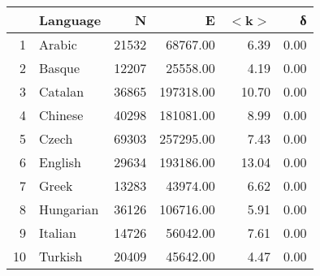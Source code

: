\begin{tabular}{rlrrrr}
  \hline
 & Language & N & E & $<$k$>$ & δ \\ 
  \hline
1 & Arabic & 21532 & 68767.00 & 6.39 & 0.00 \\ 
  2 & Basque & 12207 & 25558.00 & 4.19 & 0.00 \\ 
  3 & Catalan & 36865 & 197318.00 & 10.70 & 0.00 \\ 
  4 & Chinese & 40298 & 181081.00 & 8.99 & 0.00 \\ 
  5 & Czech & 69303 & 257295.00 & 7.43 & 0.00 \\ 
  6 & English & 29634 & 193186.00 & 13.04 & 0.00 \\ 
  7 & Greek & 13283 & 43974.00 & 6.62 & 0.00 \\ 
  8 & Hungarian & 36126 & 106716.00 & 5.91 & 0.00 \\ 
  9 & Italian & 14726 & 56042.00 & 7.61 & 0.00 \\ 
  10 & Turkish & 20409 & 45642.00 & 4.47 & 0.00 \\ 
   \hline
\end{tabular}
